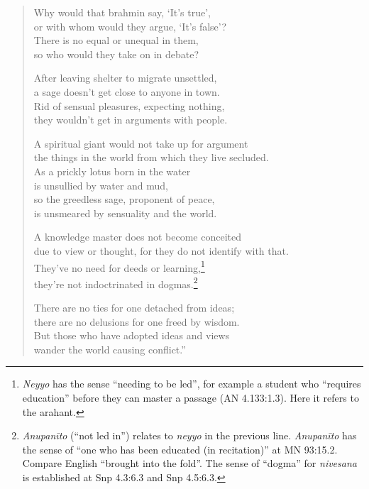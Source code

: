 \documentclass[12pt,openany]{book}%
\begin{document}
\begin{verse}
Why would that brahmin say, ‘It’s true’, \\
or with whom would they argue, ‘It’s false’? \\
There is no equal or unequal in them, \\
so who would they take on in debate? 

After leaving shelter to migrate unsettled, \\
a sage doesn’t get close to anyone in town. \\
Rid of sensual pleasures, expecting nothing, \\
they wouldn’t get in arguments with people. 

A spiritual giant would not take up for argument \\
the things in the world from which they live secluded. \\
As a prickly lotus born in the water \\
is unsullied by water and mud, \\
so the greedless sage, proponent of peace, \\
is unsmeared by sensuality and the world. 

A knowledge master does not become conceited \\
due to view or thought, for they do not identify with that. \\
They’ve no need for deeds or learning,\footnote{\textit{Neyyo} has the sense “needing to be led”, for example a student who “requires education” before they can master a passage (AN 4.133:1.3). Here it refers to the arahant. } \\
they’re not indoctrinated in dogmas.\footnote{\textit{\textsanskrit{Anupanīto}} (“not led in”) relates to \textit{neyyo} in the previous line. \textit{\textsanskrit{Anupanīto}} has the sense of “one who has been educated (in recitation)” at MN 93:15.2. Compare English “brought into the fold”. The sense of “dogma” for \textit{nivesana} is established at Snp 4.3:6.3 and Snp 4.5:6.3. } 

There are no ties for one detached from ideas; \\
there are no delusions for one freed by wisdom. \\
But those who have adopted ideas and views \\
wander the world causing conflict.” 

%
\end{verse}
\end{document}

